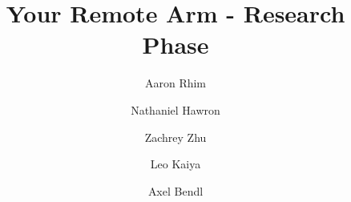 \documentclass[document]{llncs}
\begin{document}
\title{Your Remote Arm - Research Phase}
\author{Aaron Rhim \and
Nathaniel Hawron\and
Zachrey Zhu\and
Leo Kaiya\and
Axel Bendl}


\maketitle


\end{document}
